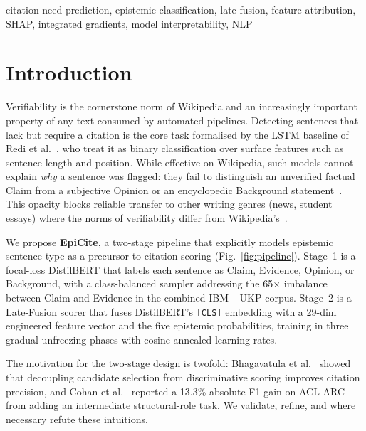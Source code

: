 \documentclass[conference]{IEEEtran}
\begin{document}
\begin{IEEEkeywords}
citation-need prediction, epistemic classification, late fusion, feature
attribution, SHAP, integrated gradients, model interpretability, NLP
\end{IEEEkeywords}

\section{Introduction}

Verifiability is the cornerstone norm of Wikipedia and an increasingly
important property of any text consumed by automated pipelines. Detecting
sentences that lack but require a citation is the core task formalised by
the LSTM baseline of Redi et al.~\cite{redi2019citation}, who treat it as
binary classification over surface features such as sentence length and
position. While effective on Wikipedia, such models cannot explain
\emph{why} a sentence was flagged: they fail to distinguish an unverified
factual Claim from a subjective Opinion or an encyclopedic
Background statement~\cite{cohan2019structural}. This opacity blocks
reliable transfer to other writing genres (news, student essays) where the
norms of verifiability differ from Wikipedia's~\cite{stab2014annotating,zhang2020dual}.

We propose \textbf{EpiCite}, a two-stage pipeline that explicitly models
epistemic sentence type as a precursor to citation scoring (Fig.~\ref{fig:pipeline}).
Stage~1 is a focal-loss DistilBERT that labels each sentence as
Claim, Evidence, Opinion, or Background, with a class-balanced sampler
addressing the 65$\times$ imbalance between Claim and Evidence in the
combined IBM\,+\,UKP corpus. Stage~2 is a Late-Fusion scorer that fuses
DistilBERT's \texttt{[CLS]} embedding with a 29-dim engineered feature
vector and the five epistemic probabilities, training in three gradual
unfreezing phases with cosine-annealed learning rates.

The motivation for the two-stage design is twofold:
Bhagavatula et al.~\cite{bhagavatula2018content} showed that decoupling
candidate selection from discriminative scoring improves citation precision,
and Cohan et al.~\cite{cohan2019structural} reported a 13.3\% absolute F1
gain on ACL-ARC from adding an intermediate structural-role task. We
validate, refine, and where necessary refute these intuitions.
\end{document}
